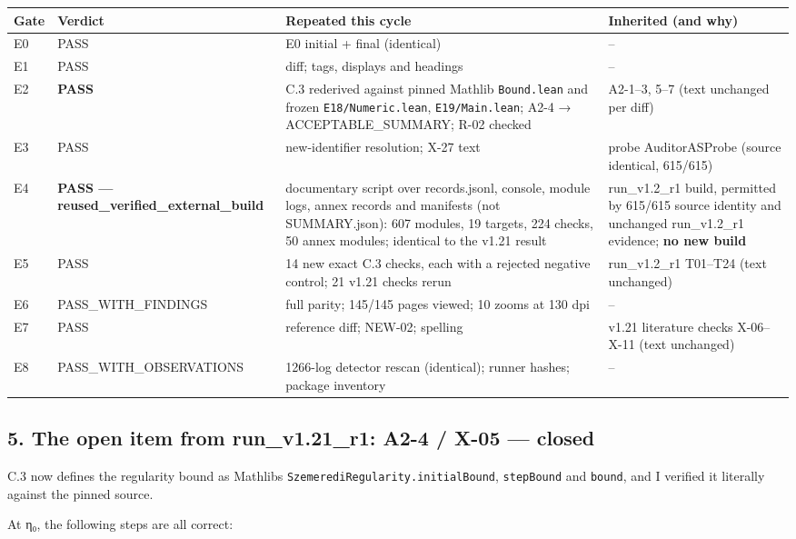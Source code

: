 \documentclass[
]{article}
\newcounter{none} %
\begin{document}
{\def\LTcaptype{none} %
\begin{longtable}[]{@{}llll@{}}
\toprule\noalign{}
Gate & Verdict & Repeated this cycle & Inherited (and why) \\
\midrule\noalign{}
\endhead
\bottomrule\noalign{}
\endlastfoot
E0 & PASS & E0 initial + final (identical) & -- \\
E1 & PASS & diff; tags, displays and headings & -- \\
E2 & \textbf{PASS} & C.3 rederived against pinned Mathlib
\texttt{Bound.lean} and frozen \texttt{E18/Numeric.lean},
\texttt{E19/Main.lean}; A2-4 → ACCEPTABLE\_SUMMARY; R-02 checked &
A2-1--3, 5--7 (text unchanged per diff) \\
E3 & PASS & new-identifier resolution; X-27 text & probe AuditorASProbe
(source identical, 615/615) \\
E4 & \textbf{PASS --- reused\_verified\_external\_build} & documentary
script over records.jsonl, console, module logs, annex records and
manifests (not SUMMARY.json): 607 modules, 19 targets, 224 checks, 50
annex modules; identical to the v1.21 result & run\_v1.2\_r1 build,
permitted by 615/615 source identity and unchanged run\_v1.2\_r1
evidence; \textbf{no new build} \\
E5 & PASS & 14 new exact C.3 checks, each with a rejected negative
control; 21 v1.21 checks rerun & run\_v1.2\_r1 T01--T24 (text
unchanged) \\
E6 & PASS\_WITH\_FINDINGS & full parity; 145/145 pages viewed; 10 zooms
at 130 dpi & -- \\
E7 & PASS & reference diff; NEW-02; spelling & v1.21 literature checks
X-06--X-11 (text unchanged) \\
E8 & PASS\_WITH\_OBSERVATIONS & 1266-log detector rescan (identical);
runner hashes; package inventory & -- \\
\end{longtable}
}

\subsection{5. The open item from run\_v1.21\_r1: A2-4 / X-05 ---
closed}\label{5-the-open-item-from-run_v121_r1-a2-4--x-05--closed}

C.3 now defines the regularity bound as Mathlib\textquotesingle s
\texttt{SzemerediRegularity.initialBound}, \texttt{stepBound} and
\texttt{bound}, and I verified it literally against the pinned source.

At η₀, the following steps are all correct:
\end{document}

